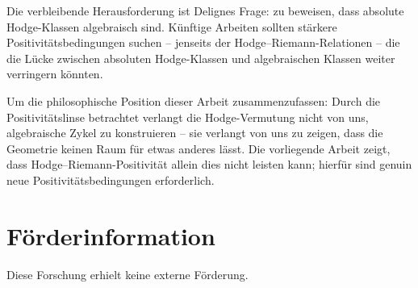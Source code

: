 \documentclass[aps,prd,twocolumn,superscriptaddress,nofootinbib]{revtex4-2}
\theoremstyle{definition}
\theoremstyle{remark}
\begin{document}
Die verbleibende Herausforderung ist Delignes Frage: zu beweisen, dass absolute Hodge-Klassen algebraisch sind. Künftige Arbeiten sollten stärkere Positivitätsbedingungen suchen -- jenseits der Hodge--Riemann-Relationen -- die die Lücke zwischen absoluten Hodge-Klassen und algebraischen Klassen weiter verringern könnten.

Um die philosophische Position dieser Arbeit zusammenzufassen: Durch die Positivitätslinse betrachtet verlangt die Hodge-Vermutung nicht von uns, algebraische Zykel zu konstruieren -- sie verlangt von uns zu zeigen, dass die Geometrie keinen Raum für etwas anderes lässt. Die vorliegende Arbeit zeigt, dass Hodge--Riemann-Positivität allein dies nicht leisten kann; hierfür sind genuin neue Positivitätsbedingungen erforderlich.


\section*{Förderinformation}
Diese Forschung erhielt keine externe Förderung.
\end{document}
